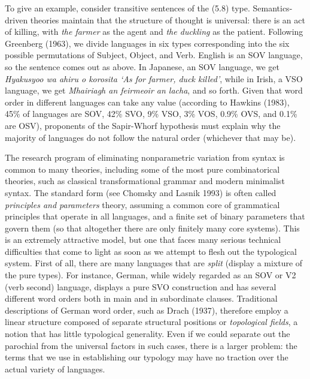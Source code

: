 To give an example, consider transitive sentences of the (5.8) type.
Semantics-driven theories maintain that the structure of thought is universal:
there is an act of killing, with {\it the farmer} as the agent and {\it the
  duckling} as the patient. Following Greenberg (1963),\nocite{Greenberg:1963}
we divide languages in six types corresponding into the six possible
permutations of Subject, Object, and Verb.  English is an SOV language, so the
sentence comes out as above. In Japanese, an SOV language, we get {\it
  Hyakusyoo wa ahiru o korosita `As for farmer, duck killed'}, while in Irish,
a VSO language, we get {\it Mhairiagh an feirmeoir an lacha}, and so forth.
Given that word order in different languages can take any value (according to
Hawkins (1983), 45\% of languages are SOV, 42\% SVO, 9\% VSO, 3\% VOS, 0.9\%
OVS, and 0.1\% are OSV), proponents of the Sapir-Whorf hypothesis must explain
why the majority of languages do not follow the natural order (whichever
that may be).    \nocite{Hawkins:1983}

The research program of eliminating nonparametric variation from syntax is
common to many theories, including some of the most pure combinatorical
theories, such as classical transformational grammar and modern minimalist
syntax. The standard form (see Chomsky and Lasnik 1993)\nocite{Chomsky:1993}
is often called {\it principles and parameters} theory, assuming a common core of grammatical principles that
operate in all languages, and a finite set of binary parameters that govern
them (so that altogether there are only finitely many core systems).  This is
an extremely attractive model, but one that faces many serious technical
difficulties that come to light as soon as we attempt to flesh out the
typological system. First of all, there are many
languages that are {\it split} (display a mixture of the pure types). For
instance, German, while widely regarded as an SOV or V2 (verb second)
language, displays a pure SVO construction and has several different word
orders both in main and in subordinate clauses. Traditional descriptions of
German word order, such as Drach (1937),\nocite{Drach:1937} therefore employ a
linear structure composed of separate structural positions or {\it topological
  fields}, a notion that has little typological generality. Even if we could
separate out the parochial from the universal factors in such cases, there is
a larger problem: the terms that we use in establishing our typology may have
no traction over the actual variety of
languages.\nocite{Schachter:1976}

